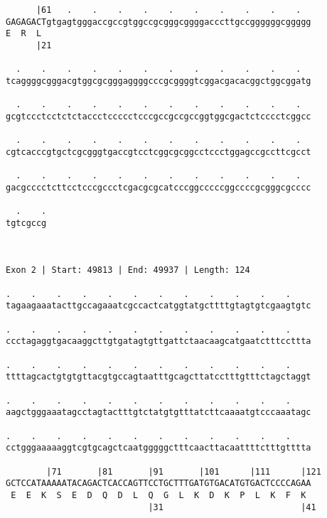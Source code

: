 \documentclass{article}
\begin{document}
\begin{Verbatim}
      |61   .    .    .    .    .    .    .    .    .    .  
GAGAGACTgtgagtgggaccgccgtggccgcgggcggggacccttgccggggggcggggg
E  R  L                                                     
      |21                                                   
  
  .    .    .    .    .    .    .    .    .    .    .    .  
tcaggggcgggacgtggcgcgggaggggcccgcggggtcggacgacacggctggcggatg
                                                            
  .    .    .    .    .    .    .    .    .    .    .    .  
gcgtccctcctctctaccctccccctcccgccgccgccggtggcgactctcccctcggcc
                                                            
  .    .    .    .    .    .    .    .    .    .    .    .  
cgtcacccgtgctcgcgggtgaccgtcctcggcgcggcctccctggagccgccttcgcct
                                                            
  .    .    .    .    .    .    .    .    .    .    .    .  
gacgcccctcttcctcccgccctcgacgcgcatcccggcccccggccccgcgggcgcccc
                                                            
  .    .
tgtcgccg
        
        
 
Exon 2 | Start: 49813 | End: 49937 | Length: 124
 
.    .    .    .    .    .    .    .    .    .    .    .    
tagaagaaatacttgccagaaatcgccactcatggtatgcttttgtagtgtcgaagtgtc
                                                            
.    .    .    .    .    .    .    .    .    .    .    .    
ccctagaggtgacaaggcttgtgatagtgttgattctaacaagcatgaatctttccttta
                                                            
.    .    .    .    .    .    .    .    .    .    .    .    
ttttagcactgtgtgttacgtgccagtaatttgcagcttatcctttgtttctagctaggt
                                                            
.    .    .    .    .    .    .    .    .    .    .    .    
aagctgggaaatagcctagtactttgtctatgtgtttatcttcaaaatgtcccaaatagc
                                                            
.    .    .    .    .    .    .    .    .    .    .    .    
cctgggaaaaaggtcgtgcagctcaatgggggctttcaacttacaattttctttgtttta
                                                            
        |71       |81       |91       |101      |111      |121
GCTCCATAAAAATACAGACTCACCAGTTCCTGCTTTGATGTGACATGTGACTCCCCAGAA
 E  E  K  S  E  D  Q  D  L  Q  G  L  K  D  K  P  L  K  F  K 
                            |31                           |41
  

\end{Verbatim}
\end{document}
